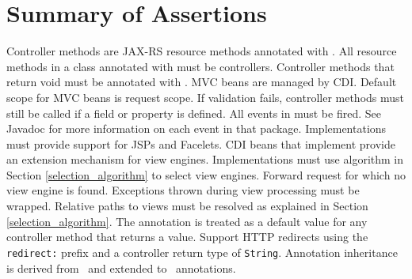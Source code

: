 \chapter{Summary of Assertions}
\label{assertions}

\begin{description}
 Controller methods are JAX-RS resource methods annotated with .
 All resource methods in a class annotated with  must
be controllers.
 Controller methods that return void must be annotated with .
 MVC beans are managed by CDI.
 Default scope for MVC beans is request scope.
 If validation fails, controller methods must still be called if a 
 field or property is defined. 
 All events in  must be fired. See Javadoc for more
information on each event in that package.
 Implementations must provide support for JSPs and Facelets.
 CDI beans that implement  provide
an extension mechanism for view engines.
 Implementations must use algorithm in Section \ref{selection_algorithm} 
to select view engines.
 Forward request for which no view engine is found.
 Exceptions thrown during view processing must be wrapped.
 Relative paths to views must be resolved as explained in 
Section \ref{selection_algorithm}.
 The  annotation is treated as a default value for any controller 
method that returns a  value.
 Support HTTP redirects using the {\tt redirect:} prefix and a controller
return type of {\tt String}.
 Annotation inheritance is derived from \jaxrs\  and extended to 
\mvc\ annotations. 
\end{description}
